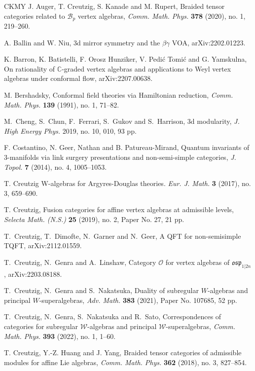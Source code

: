 \documentclass[11pt, reqno]{amsart}
\theoremstyle{definition}\newtheorem{defi}[thm]{Definition}
\theoremstyle{definition}\newtheorem{rem}[thm]{Remark}
\theoremstyle{definition}\newtheorem{exam}[thm]{Example}
\theoremstyle{definition}\newtheorem{assum}[thm]{Assumption}
\newcommand{\CC}{\mathbb{C}}
\begin{document}
\begin{thebibliography}{CKMY}
J. Auger, T. Creutzig, S. Kanade and M. Rupert, Braided tensor categories related to $\mathcal{B}_p$ vertex algebras, \textit{Comm. Math. Phys.} \textbf{378} (2020), no. 1, 219--260.

A. Ballin and W. Niu, 3d mirror symmetry and the $\beta\gamma$ VOA, arXiv:2202.01223.

K. Barron, K. Batistelli, F. Orosz Hunziker, V. Pedi\'{c} Tomi\'{c} and G. Yamskulna, On rationality of $\CC$-graded vertex algebras and applications to Weyl vertex algebras under conformal flow, arXiv:2207.00638.

 M. Bershadsky, Conformal field theories via Hamiltonian reduction, \textit{Comm. Math. Phys.} \textbf{139} (1991), no. 1, 71--82.

M.~Cheng, S.~Chun, F.~Ferrari, S.~Gukov and S.~Harrison, $3$d modularity, \textit{J. High Energy Phys.} 2019, no. 10, 010, 93 pp.

 F. Costantino, N. Geer, Nathan and B. Patureau-Mirand,  Quantum invariants of $3$-manifolds via link surgery presentations and non-semi-simple categories, \textit{J. Topol.} \textbf{7} (2014), no. 4, 1005--1053. 

T. Creutzig W-algebras for Argyres-Douglas theories. \textit{Eur. J. Math.} \textbf{3} (2017), no. 3, 659--690.

T. Creutzig, Fusion categories for affine vertex algebras at admissible levels, \textit{Selecta Math. (N.S.)} \textbf{25} (2019), no. 2, Paper No. 27, 21 pp.

T.~Creutzig, T.~Dimofte, N.~Garner and N.~Geer,
A QFT for non-semisimple TQFT,
arXiv:2112.01559.

T.~Creutzig, N.~Genra and A.~Linshaw,
Category $\mathcal O$ for vertex algebras of $\mathfrak{osp}_{1|2n}$, arXiv:2203.08188.

T.~Creutzig, N.~Genra and S.~Nakatsuka,
Duality of subregular $W$-algebras and principal $W$-superalgebras,
\textit{Adv. Math.} \textbf{383} (2021), Paper No. 107685, 52 pp.

T.~Creutzig, N.~Genra, S.~Nakatsuka and R.~Sato,
Correspondences of categories for subregular ${{\mathcal {W}}}$-algebras and principal ${\mathcal {W}}$-superalgebras,
\textit{Comm. Math. Phys.} \textbf{393} (2022), no. 1, 1--60.

T. Creutzig, Y.-Z. Huang and J. Yang, Braided tensor categories of admissible modules for affine Lie algebras, \textit{Comm. Math. Phys.} \textbf{362} (2018), no. 3, 827--854. 


\end{thebibliography}
\end{document}
